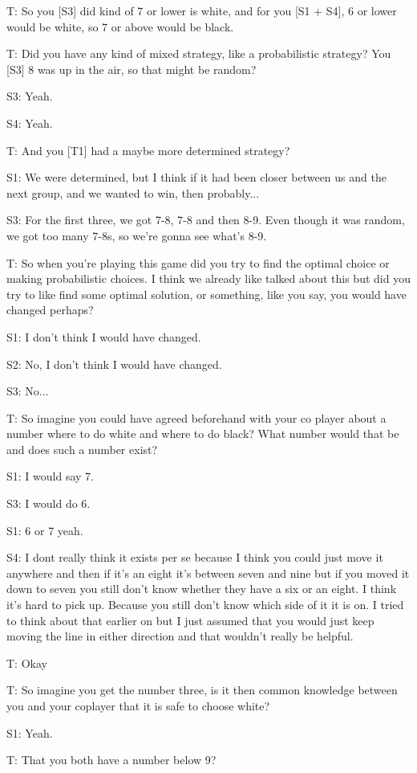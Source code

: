 T: So you [S3] did kind of 7 or lower is white, and for you [S1 + S4], 6 or lower would be white, so 7 or above would be black.

T: Did you have any kind of mixed strategy, like a probabilistic strategy? You [S3] 8 was up in the air, so that might be random?

S3: Yeah.

S4: Yeah.

T: And you [T1] had a maybe more determined strategy?

S1: We were determined, but I think if it had been closer between us and the next group, and we wanted to win, then probably...

S3: For the first three, we got 7-8, 7-8 and then 8-9. Even though it was random, we got too many 7-8s, so we're gonna see what's 8-9.

T: So when you're playing this game did you try to find the optimal choice or making probabilistic choices. I think we already like talked about this but did you try to like find some optimal solution, or something, like you say, you would have changed perhaps?

S1: I don't think I would have changed.

S2: No, I don't think I would have changed.

S3: No...

T: So imagine you could have agreed beforehand with your co player about a number where to do white and where to do black? What number would that be and does such a number exist?

S1: I would say 7.

S3: I would do 6.

S1: 6 or 7 yeah.

S4: I dont really think it exists per se because I think you could just move it anywhere and then if it's an eight it's between seven and nine but if you moved it down to seven you still don't know whether they have a six or an eight. I think it's hard to pick up. Because you still don't know which side of it it is on. I tried to think about that earlier on but I just assumed that you would just keep moving the line in either direction and that wouldn't really be helpful.

T: Okay

T: So imagine you get the number three, is it then common knowledge between you and your coplayer that it is safe to choose white?

S1: Yeah.

T: That you both have a number below 9?

